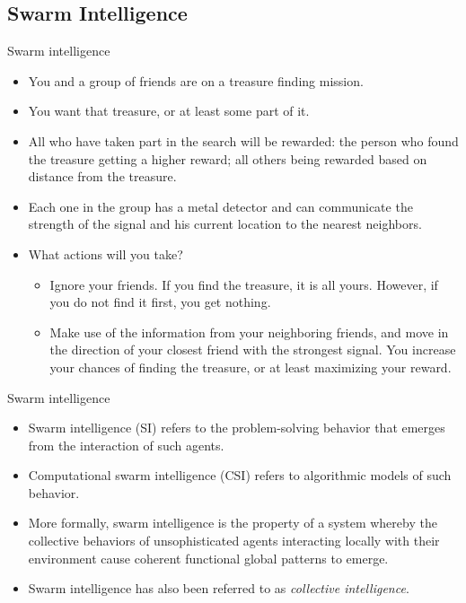 \documentclass[aspectratio=169,compress,10pt]{beamer}
\begin{document}
\subsection{Swarm Intelligence}
\begin{frame}{Swarm intelligence}
\begin{itemize}
	\item You and a group of friends are on a treasure finding mission. 
	\item You want that treasure, or at least some part of it.
	\item All who have taken part in the search will be rewarded: the person who found the treasure getting a higher reward; all others being rewarded based on distance from the treasure.
	\item Each one in the group has a metal detector and can communicate the strength of the signal and his current location to the nearest neighbors.
	\item What actions will you take? 
	\begin{itemize}
		\item Ignore your friends. If you find the treasure, it is all yours. However, if you do not find it first, you get nothing.
		\item Make use of the information from your neighboring friends, and move in the direction of your closest friend with the strongest signal.
		You increase your chances of finding the treasure, or at least maximizing your reward.
	\end{itemize}
\end{itemize}
\end{frame}

\begin{frame}{Swarm intelligence}
\begin{itemize}
	\item Swarm intelligence (SI) refers to the problem-solving behavior that emerges from the interaction of such agents.
	\item Computational swarm intelligence (CSI) refers to algorithmic models of such behavior.
	\item More formally, swarm intelligence is the property of a system whereby the collective behaviors of unsophisticated agents interacting locally with their environment cause coherent functional global patterns to emerge.
	\item Swarm intelligence has also been referred to as \emph{collective intelligence}.
\end{itemize}
\end{frame}
\end{document}
